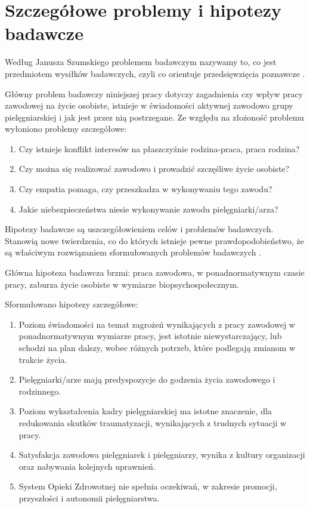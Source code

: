 \documentclass[a4paper,12pt,twoside,openany]{report}
\begin{document}
\section{Szczegółowe problemy i hipotezy badawcze}
Według Janusza Szumskiego problemem badawczym nazywamy to, co jest przedmiotem wysiłków badawczych, czyli co orientuje przedsięwzięcia poznawcze \cite{janusz}.

Główny problem badawczy niniejszej pracy dotyczy zagadnienia czy wpływ pracy zawodowej na życie osobiste, istnieje w świadomości aktywnej zawodowo grupy pielęgniarskiej i jak jest przez nią postrzegane. Ze względu na złożoność problemu wyłoniono problemy szczegółowe:
\begin{enumerate}
	\item Czy istnieje konflikt interesów na płaszczyźnie rodzina-praca, praca rodzina?
	\item Czy można się realizować zawodowo i prowadzić szczęśliwe życie osobiste?
	\item Czy empatia pomaga, czy przeszkadza w wykonywaniu tego zawodu?
	\item Jakie niebezpieczeństwa niesie wykonywanie zawodu pielęgniarki/arza?
\end{enumerate}

Hipotezy badawcze są uszczegółowieniem celów i problemów badawczych. Stanowią nowe twierdzenia, co do których istnieje pewne prawdopodobieństwo, że są właściwym rozwiązaniem sformułowanych problemów badawczych \cite{janusz}.

Główna hipoteza badawcza brzmi: praca zawodowa, w ponadnormatywnym czasie pracy, zaburza życie osobiste w wymiarze biopsychospołecznym.

Sformułowano hipotezy szczegółowe:
\begin{enumerate}
	\item  Poziom świadomości na temat zagrożeń wynikających z pracy zawodowej w ponadnormatywnym wymiarze pracy,  jest  istotnie niewystarczający, lub schodzi na plan dalszy, wobec różnych potrzeb, które podlegają zmianom w trakcie życia.
	\item Pielęgniarki/arze mają predyspozycje do godzenia życia zawodowego i rodzinnego.
	\item Poziom wykształcenia kadry pielęgniarskiej ma istotne znaczenie, dla  redukowania skutków traumatyzacji, wynikających z trudnych sytuacji w pracy.
	\item Satysfakcja zawodowa pielęgniarek i pielęgniarzy, wynika z kultury organizacji oraz nabywania kolejnych uprawnień.
	\item System Opieki Zdrowotnej nie spełnia oczekiwań, w zakresie promocji, przyszłości i autonomii pielęgniarstwa.
\end{enumerate}
\end{document}
